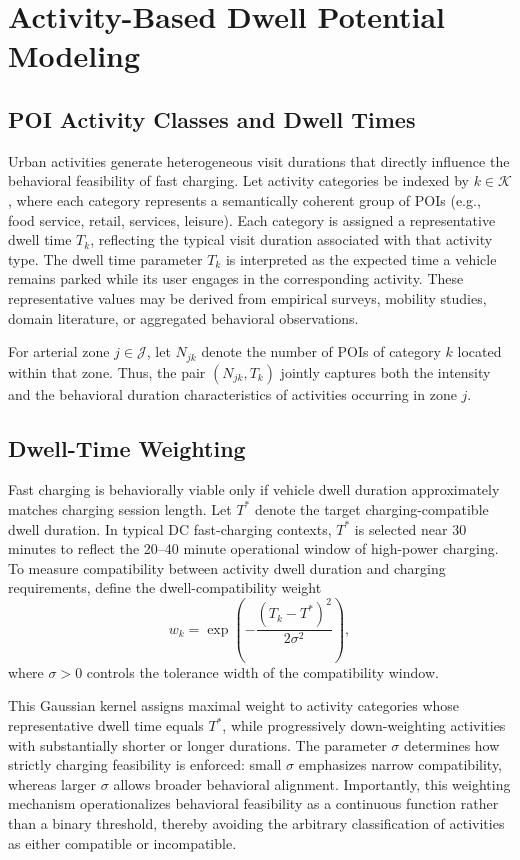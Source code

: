 \documentclass[conference]{IEEEtran}
\begin{document}
\section{Activity-Based Dwell Potential Modeling}

\subsection{POI Activity Classes and Dwell Times}

Urban activities generate heterogeneous visit durations that directly
influence the behavioral feasibility of fast charging. Let activity
categories be indexed by $k\in\mathcal{K}$, where each category
represents a semantically coherent group of POIs (e.g., food service,
retail, services, leisure). Each category is assigned a representative
dwell time $T_k$, reflecting the typical visit duration associated with that activity type.
The dwell time parameter $T_k$ is interpreted as the expected time a
vehicle remains parked while its user engages in the corresponding
activity. These representative values may be derived from empirical
surveys, mobility studies, domain literature, or aggregated behavioral
observations.

For arterial zone $j\in\mathcal{J}$, let $N_{jk}$ denote the number of POIs of category $k$ located within that zone.
Thus, the pair $(N_{jk}, T_k)$ jointly captures both the intensity and
the behavioral duration characteristics of activities occurring in
zone $j$.

\subsection{Dwell-Time Weighting}

Fast charging is behaviorally viable only if vehicle dwell duration
approximately matches charging session length. Let $T^\ast$ denote the
target charging-compatible dwell duration. In typical DC fast-charging
contexts, $T^\ast$ is selected near 30 minutes to reflect the
20--40 minute operational window of high-power charging.
To measure compatibility between activity dwell duration and charging
requirements, define the dwell-compatibility weight
\begin{equation}
w_k =
\exp\!\left(
-\frac{(T_k - T^\ast)^2}{2\sigma^2}
\right),
\end{equation}
where $\sigma > 0$ controls the tolerance width of the compatibility
window.

This Gaussian kernel assigns maximal weight to activity categories
whose representative dwell time equals $T^\ast$, while progressively
down-weighting activities with substantially shorter or longer
durations. The parameter $\sigma$ determines how strictly charging
feasibility is enforced: small $\sigma$ emphasizes narrow
compatibility, whereas larger $\sigma$ allows broader behavioral
alignment. Importantly, this weighting mechanism operationalizes behavioral
feasibility as a continuous function rather than a binary threshold,
thereby avoiding the arbitrary classification of activities as either
compatible or incompatible.
\end{document}
